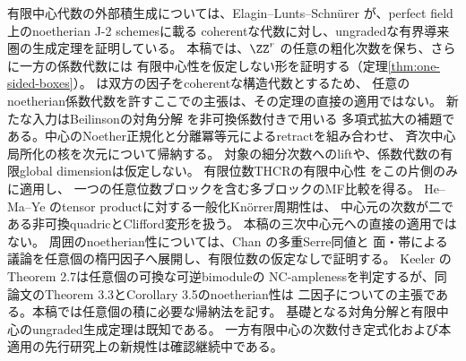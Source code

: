 有限中心代数の外部積生成については、Elagin--Lunts--Schn\"urer
\cite[Theorem 4.18]{ELS} が、perfect field上のnoetherian J-2 schemesに載る
coherentな代数に対し、ungradedな有界導来圏の生成定理を証明している。
本稿では、\(\ZZ^r\) の任意の粗化次数を保ち、さらに一方の係数代数には
有限中心性を仮定しない形を証明する（定理\ref{thm:one-sided-boxes}）。
\cite[Theorem 4.18]{ELS} は双方の因子をcoherentな構造代数とするため、
任意のnoetherian係数代数を許すここでの主張は、その定理の直接の適用ではない。
新たな入力はBeilinsonの対角分解 \cite{Beilinson} を非可換係数付きで用いる
多項式拡大の補題である。中心のNoether正規化と分離冪等元によるretractを組み合わせ、
斉次中心局所化の核を次元について帰納する。
対象の細分次数へのliftや、係数代数の有限global dimensionは仮定しない。
有限位数THCRの有限中心性 \cite[Corollary 2.3]{SmithTate} をこの片側のみに適用し、
一つの任意位数ブロックを含む多ブロックのMF比較を得る。
He--Ma--Ye \cite{HMY} のtensor productに対する一般化Kn\"orrer周期性は、
中心元の次数が二である非可換quadricとClifford変形を扱う。
本稿の三次中心元への直接の適用ではない。
周囲のnoetherian性については、Chan \cite{ChanMulti} の多重Serre同値と
面・帯による議論を任意個の楕円因子へ展開し、有限位数の仮定なしで証明する。
Keeler \cite{KeelerMulti} のTheorem 2.7は任意個の可換な可逆bimoduleの
NC-amplenessを判定するが、同論文のTheorem 3.3とCorollary 3.5のnoetherian性は
二因子についての主張である。本稿では任意個の積に必要な帰納法を記す。
基礎となる対角分解と有限中心のungraded生成定理は既知である。
一方有限中心の次数付き定式化および本適用の先行研究上の新規性は確認継続中である。

